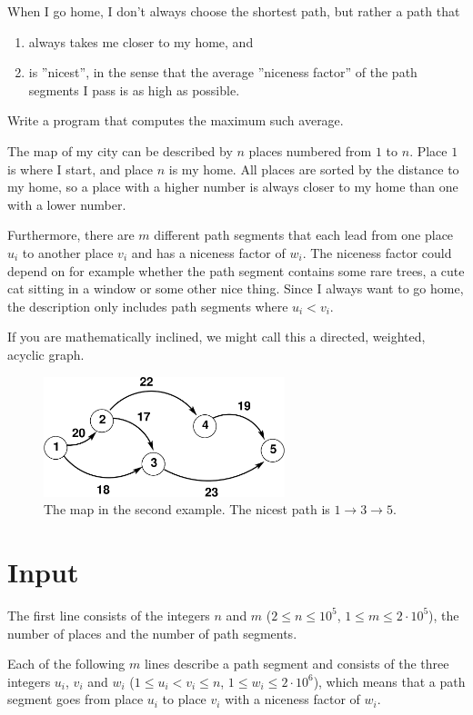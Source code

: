 When I go home, I don't always choose the shortest path, but rather a path that
\begin{enumerate}
    \item always takes me closer to my home, and
    \item is ''nicest'', in the sense that the average ''niceness factor'' of the path segments I pass is as high as possible.
\end{enumerate}
Write a program that computes the maximum such average.

The map of my city can be described by $n$ places numbered from $1$ to $n$.
Place $1$ is where I start, and place $n$ is my home.
All places are sorted by the distance to my home, so a place with a higher number is always closer to my home than one with a lower number.

Furthermore, there are $m$ different path segments that each lead from one place $u_i$ to another place $v_i$ and has a niceness factor of $w_i$.
The niceness factor could depend on for example whether the path segment contains some rare trees, a cute cat sitting in a window or some other nice thing.
Since I always want to go home, the description only includes path segments where $u_i < v_i$.

If you are mathematically inclined, we might call this a directed, weighted, acyclic graph.

\begin{figure}[h]
    \includegraphics[width=7cm]{trevlig.png}
    \caption{The map in the second example. The nicest path is $1\rightarrow 3\rightarrow 5$.}
\end{figure}

\section*{Input}
The first line consists of the integers $n$ and $m$ ($2 \leq n \leq 10^5$, $1 \leq m \leq 2\cdot 10^5$), the number of places and the number of path segments.

Each of the following $m$ lines describe a path segment and consists of the three integers $u_i$, $v_i$ and $w_i$ ($1 \leq u_i < v_i \leq n$, $1 \le w_i \le 2\cdot 10^6$),
which means that a path segment goes from place $u_i$ to place $v_i$ with a niceness factor of $w_i$.

